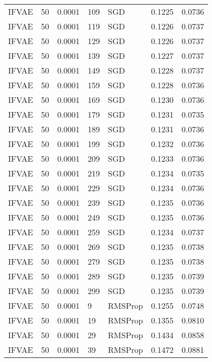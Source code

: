 \begin{tabular}{llrllrr}
 IFVAE &   50 &  0.0001 &   109 &       SGD &  0.1225 &       0.0736 \\
 IFVAE &   50 &  0.0001 &   119 &       SGD &  0.1226 &       0.0737 \\
 IFVAE &   50 &  0.0001 &   129 &       SGD &  0.1226 &       0.0737 \\
 IFVAE &   50 &  0.0001 &   139 &       SGD &  0.1227 &       0.0737 \\
 IFVAE &   50 &  0.0001 &   149 &       SGD &  0.1228 &       0.0737 \\
 IFVAE &   50 &  0.0001 &   159 &       SGD &  0.1228 &       0.0736 \\
 IFVAE &   50 &  0.0001 &   169 &       SGD &  0.1230 &       0.0736 \\
 IFVAE &   50 &  0.0001 &   179 &       SGD &  0.1231 &       0.0735 \\
 IFVAE &   50 &  0.0001 &   189 &       SGD &  0.1231 &       0.0736 \\
 IFVAE &   50 &  0.0001 &   199 &       SGD &  0.1232 &       0.0736 \\
 IFVAE &   50 &  0.0001 &   209 &       SGD &  0.1233 &       0.0736 \\
 IFVAE &   50 &  0.0001 &   219 &       SGD &  0.1234 &       0.0735 \\
 IFVAE &   50 &  0.0001 &   229 &       SGD &  0.1234 &       0.0736 \\
 IFVAE &   50 &  0.0001 &   239 &       SGD &  0.1235 &       0.0736 \\
 IFVAE &   50 &  0.0001 &   249 &       SGD &  0.1235 &       0.0736 \\
 IFVAE &   50 &  0.0001 &   259 &       SGD &  0.1234 &       0.0737 \\
 IFVAE &   50 &  0.0001 &   269 &       SGD &  0.1235 &       0.0738 \\
 IFVAE &   50 &  0.0001 &   279 &       SGD &  0.1235 &       0.0738 \\
 IFVAE &   50 &  0.0001 &   289 &       SGD &  0.1235 &       0.0739 \\
 IFVAE &   50 &  0.0001 &   299 &       SGD &  0.1235 &       0.0739 \\
 IFVAE &   50 &  0.0001 &     9 &   RMSProp &  0.1255 &       0.0748 \\
 IFVAE &   50 &  0.0001 &    19 &   RMSProp &  0.1355 &       0.0810 \\
 IFVAE &   50 &  0.0001 &    29 &   RMSProp &  0.1434 &       0.0858 \\
 IFVAE &   50 &  0.0001 &    39 &   RMSProp &  0.1472 &       0.0881 \\

\end{tabular}
